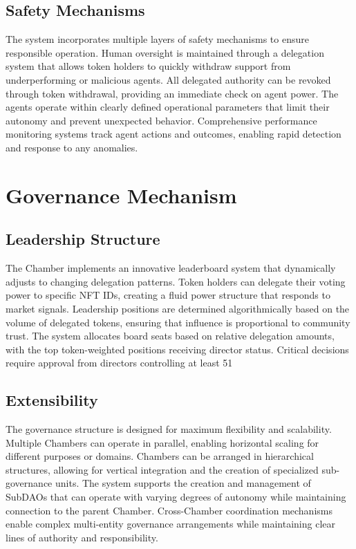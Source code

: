 \documentclass[12pt]{article}
\begin{document}
\subsection{Safety Mechanisms}
The system incorporates multiple layers of safety mechanisms to ensure responsible operation. Human oversight is maintained through a delegation system that allows token holders to quickly withdraw support from underperforming or malicious agents. All delegated authority can be revoked through token withdrawal, providing an immediate check on agent power. The agents operate within clearly defined operational parameters that limit their autonomy and prevent unexpected behavior. Comprehensive performance monitoring systems track agent actions and outcomes, enabling rapid detection and response to any anomalies.

\section{Governance Mechanism}

\subsection{Leadership Structure}
The Chamber implements an innovative leaderboard system that dynamically adjusts to changing delegation patterns. Token holders can delegate their voting power to specific NFT IDs, creating a fluid power structure that responds to market signals. Leadership positions are determined algorithmically based on the volume of delegated tokens, ensuring that influence is proportional to community trust. The system allocates board seats based on relative delegation amounts, with the top token-weighted positions receiving director status. Critical decisions require approval from directors controlling at least 51%

\subsection{Extensibility}
The governance structure is designed for maximum flexibility and scalability. Multiple Chambers can operate in parallel, enabling horizontal scaling for different purposes or domains. Chambers can be arranged in hierarchical structures, allowing for vertical integration and the creation of specialized sub-governance units. The system supports the creation and management of SubDAOs that can operate with varying degrees of autonomy while maintaining connection to the parent Chamber. Cross-Chamber coordination mechanisms enable complex multi-entity governance arrangements while maintaining clear lines of authority and responsibility.
\end{document}
